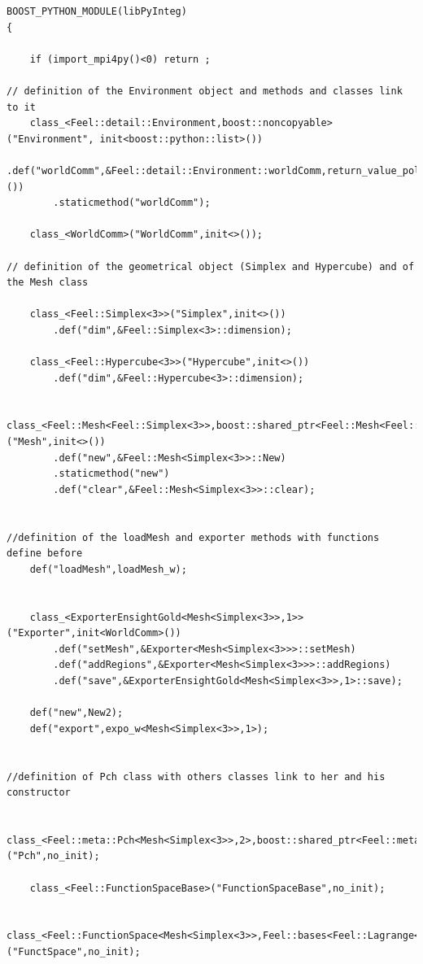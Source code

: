 \documentclass[french,12pt]{article}
\begin{document}
\begin{lstlisting}
BOOST_PYTHON_MODULE(libPyInteg)
{

    if (import_mpi4py()<0) return ;

// definition of the Environment object and methods and classes link to it 
    class_<Feel::detail::Environment,boost::noncopyable>("Environment", init<boost::python::list>()) 
        .def("worldComm",&Feel::detail::Environment::worldComm,return_value_policy<copy_non_const_reference>())
        .staticmethod("worldComm");
    
    class_<WorldComm>("WorldComm",init<>());

// definition of the geometrical object (Simplex and Hypercube) and of the Mesh class 
    
    class_<Feel::Simplex<3>>("Simplex",init<>())
        .def("dim",&Feel::Simplex<3>::dimension);

    class_<Feel::Hypercube<3>>("Hypercube",init<>())
        .def("dim",&Feel::Hypercube<3>::dimension);

    class_<Feel::Mesh<Feel::Simplex<3>>,boost::shared_ptr<Feel::Mesh<Feel::Simplex<3>>>,boost::noncopyable>("Mesh",init<>())
        .def("new",&Feel::Mesh<Simplex<3>>::New)
        .staticmethod("new")
        .def("clear",&Feel::Mesh<Simplex<3>>::clear);


//definition of the loadMesh and exporter methods with functions define before 
    def("loadMesh",loadMesh_w);

 
    class_<ExporterEnsightGold<Mesh<Simplex<3>>,1>>("Exporter",init<WorldComm>())
        .def("setMesh",&Exporter<Mesh<Simplex<3>>>::setMesh) 
        .def("addRegions",&Exporter<Mesh<Simplex<3>>>::addRegions)
        .def("save",&ExporterEnsightGold<Mesh<Simplex<3>>,1>::save);

    def("new",New2); 
    def("export",expo_w<Mesh<Simplex<3>>,1>);
   

//definition of Pch class with others classes link to her and his constructor

    class_<Feel::meta::Pch<Mesh<Simplex<3>>,2>,boost::shared_ptr<Feel::meta::Pch<Mesh<Simplex<3>>,2>>>("Pch",no_init);

    class_<Feel::FunctionSpaceBase>("FunctionSpaceBase",no_init);

    class_<Feel::FunctionSpace<Mesh<Simplex<3>>,Feel::bases<Feel::Lagrange<2,Feel::Scalar,Feel::Continuous,Feel::PointSetEquiSpaced,0>>,double,Feel::Periodicity<Feel::NoPeriodicity>,Feel::mortars<Feel::NoMortar>>,boost::shared_ptr<Feel::FunctionSpace<Mesh<Simplex<3>>,Feel::bases<Feel::Lagrange<2,Feel::Scalar,Feel::Continuous,Feel::PointSetEquiSpaced,0>>,double,Feel::Periodicity<Feel::NoPeriodicity>,Feel::mortars<Feel::NoMortar>>>,boost::python::bases<Feel::FunctionSpaceBase>>("FunctSpace",no_init);


\end{lstlisting}
\end{document}
